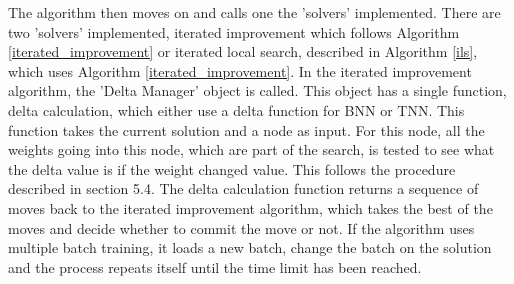 \noindent The algorithm then moves on and calls one the 'solvers' implemented. There are two 'solvers' implemented, iterated improvement which follows Algorithm \ref{iterated_improvement} or iterated local search, described in Algorithm \ref{ils}, which uses Algorithm \ref{iterated_improvement}. In the iterated improvement algorithm, the 'Delta Manager' object is called. This object has a single function, delta calculation, which either use a delta function for BNN or TNN. This function takes the current solution and a node as input. For this node, all the weights going into this node, which are part of the search, is tested to see what the delta value is if the weight changed value. This follows the procedure described in section 5.4. The delta calculation function returns a sequence of moves back to the iterated improvement algorithm, which takes the best of the moves and decide whether to commit the move or not. If the algorithm uses multiple batch training, it loads a new batch, change the batch on the solution and the process repeats itself until the time limit has been reached. \\